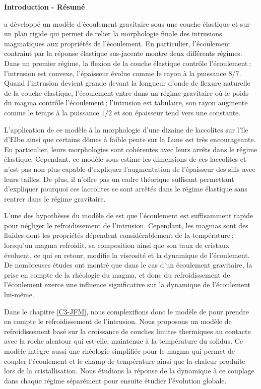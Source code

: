 \thispagestyle{plain}
\begin{flushleft}
 \Large \vspace{.5cm} \textbf{Introduction - Résumé}
\end{flushleft}
\citet{Michaut:2011kg} a  développé un modèle  d’écoulement gravitaire
sous une couche  élastique et sur un plan rigide  qui permet de relier
la  morphologie finale  des intrusions  magmatiques aux  propriétés de
l’écoulement. En  particulier, l’écoulement  contraint par  la réponse
élastique sus-jacente montre deux  différents régimes. Dans un premier
régime,  la flexion  de  la couche  élastique contrôle  l’écoulement ;
l’intrusion  est  convexe, l’épaisseur  évolue  comme  le rayon  à  la
puissance $8/7$.  Quand l’intrusion  devient grande devant la longueur
d’onde de flexure naturelle de la couche élastique, l’écoulement entre
dans un régime gravitaire où le poids du magma contrôle l’écoulement ;
l’intrusion  est tabulaire,  son rayon  augmente comme  le temps  à la
puissance $1/2$ et son épaisseur tend vers une constante.

L’application  de  ce  modèle  à   la  morphologie  d’une  dizaine  de
laccolites sur  l’île d’Elbe ainsi  que certains dômes à  faible pente
sur la Lune est très encourageante. En particulier, leurs morphologies
sont cohérentes avec leurs arrêts dans le régime élastique. Cependant,
ce modèle  sous-estime les dimensions  de ces laccolites et  n’est pas
non plus  capable d’expliquer l’augmentation de  l’épaisseur des sills
avec  leurs  tailles. De  plus,  il  n’offre  pas un  cadre  théorique
suffisant  permettant  d’expliquer  pourquoi ces  laccolites  se  sont
arrêtés  dans  le  régime  élastique   sans  rentrer  dans  le  régime
gravitaire.

L’une  des  hypothèses du  modèle  de  \citet{Michaut:2011kg} est  que
l’écoulement est suffisamment rapide  pour négliger le refroidissement
de  l’intrusion.  Cependant, les  magmas  sont  des fluides  dont  les
propriétés dépendent considérablement de  la température ;  lorsqu’un magma
refroidit, sa composition ainsi que  son taux de cristaux évoluent, ce
qui en retour,  modifie la viscosité et la  dynamique de l’écoulement.
De nombreuses études ont montré que dans le cas d’un écoulement
gravitaire, la  prise en compte de  la rhéologie du magma,  et donc du
refroidissement de l’écoulement exerce une influence significative sur
la dynamique de l’écoulement lui-même.

Dans le  chapitre \ref{C3-JFM}, nous  complexifions donc le  modèle de
\citet{Michaut:2011kg} pour  prendre en  compte le  refroidissement de
l’intrusion. Nous proposons  un modèle de refroidissement  basé sur la
croissance de  couches limites  thermiques au  contacte avec  la roche
alentour  qui est-elle,  maintenue  à la  température  du solidus.  Ce
modèle intègre aussi une rhéologie simplifiée pour le magma qui permet
de  coupler l’écoulement  et  le  champ de  température  ainsi que  la
chaleur produite lors de la  cristallisation. Nous étudions la réponse
de  la dynamique  à ce  couplage  dans chaque  régime séparément  pour
ensuite étudier l’évolution globale.

